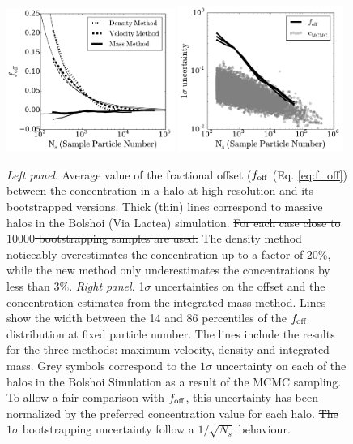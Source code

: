 \documentclass{emulateapj}
\providecommand{\DIFdel}[1]{{\protect\color{red}\sout{#1}}}                      %
\providecommand{\DIFdelFL}[1]{\DIFdel{#1}} %
\providecommand{\DIFdelbeginFL}{} %
\providecommand{\DIFdelendFL}{} %
\begin{document}
\begin{figure}
\begin{center}
  \includegraphics[width=0.49\textwidth]{avg_foff_bolshoi.pdf}
  \includegraphics[width=0.48\textwidth]{sigma_foff_bolshoi.pdf}
\end{center}
\vspace{-0.5cm}
\caption{\emph{Left panel}. Average value of the fractional offset ($f_{\rm
    off}$ (Eq. \ref{eq:f_off}) between the concentration in a halo at 
  high resolution and its bootstrapped versions. 
  Thick (thin) lines correspond to massive halos in the Bolshoi (Via
  Lactea) simulation.
  \DIFdelbeginFL \DIFdelFL{For each case close to $10000$ bootstrapping samples are used.
  }\DIFdelendFL The density method noticeably overestimates the concentration up to
  a factor of $20\%$, 
  while the new method only underestimates the concentrations by less
  than $3\%$.
  \emph{Right panel.}
  1$\sigma$ uncertainties on the offset and the concentration
  estimates from the integrated mass method.  
  Lines show the width between the 14 and 86 percentiles
  of the $f_{\rm off}$ distribution at fixed particle number. 
  The lines include the results for the three methods: maximum
  velocity, density and integrated mass.
  Grey symbols correspond to the $1\sigma$ uncertainty on each of
  the halos in the Bolshoi Simulation as a result of the MCMC
  sampling. 
  To allow a fair comparison with $f_{\rm off}$, this uncertainty has
  been normalized by the preferred concentration value for each halo. 
  \DIFdelbeginFL \DIFdelFL{The $1\sigma$ bootstrapping uncertainty follow a $1/\sqrt{N_s}$
  behaviour. 
  }\DIFdelendFL \label{fig:downsampling}}
\end{figure}
\end{document}
